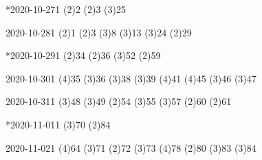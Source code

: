 \documentclass{ctexart}
\begin{document}
\begin{sdpolitics}*{2020-10-27}{1}
  \addto[2020-10-29](2){2}
  \addto[2020-10-31](2){3}
  \addto[2020-10-31](3){25}
\end{sdpolitics}

\begin{sdpolitics}{2020-10-28}{1}
  \addto[2020-10-30](2){1}
  \addto[2020-10-30](2){3}
  \addto[2020-11-01](3){8}
  \addto[2020-11-01](3){13}
  \addto[2020-11-01](3){24}
  \addto[2020-10-30](2){29}
\end{sdpolitics}

\begin{sdpolitics}*{2020-10-29}{1}
  \addto[2020-10-31](2){34}
  \addto[2020-10-31](2){36}
  \addto[2020-11-09](3){52}
  \addto[2020-10-31](2){59}
\end{sdpolitics}

\begin{sdpolitics}{2020-10-30}{1}
  \addto[2020-11-06](4){35}
  \addto[2020-11-01](3){36}
  \addto[2020-11-01](3){38}
  \addto[2020-11-01](3){39}
  \addto[2020-11-06](4){41}
  \addto[2020-11-03](4){45}
  \addto[2020-11-01](3){46}
  \addto[2020-11-01](3){47}
\end{sdpolitics}

\begin{sdpolitics}{2020-10-31}{1}
  \addto[2020-11-04](3){48}
  \addto[2020-11-04](3){49}
  \addto[2020-11-02](2){54}
  \addto[2020-11-04](3){55}
  \addto[2020-11-10](3){57}
  \addto[2020-11-02](2){60}
  \addto[2020-11-02](2){61}
\end{sdpolitics}

\begin{sdpolitics}*{2020-11-01}{1}
  \addto[2020-11-06](3){70}
  \addto[2020-11-03](2){84}
\end{sdpolitics}

\begin{sdpolitics}{2020-11-02}{1}
  \addto[2020-11-18](4){64}
  \addto[2020-11-08](3){71}
  \addto[2020-11-04](2){72}
  \addto[2020-11-06](3){73}
  \addto[2020-11-08](4){78}
  \addto[2020-11-04](2){80}
  \addto[2020-11-06](3){83}
  \addto[2020-11-06](3){84}
\end{sdpolitics}
\end{document}
